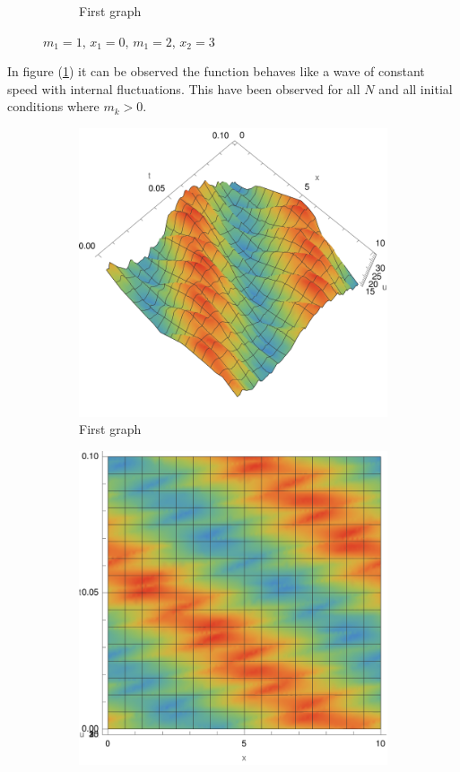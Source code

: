 \documentclass[english,master]{liumaiex}
\theoremstyle{plain}
\theoremstyle{definition}
\begin{document}
\begin{figure}[H]
\begin{subfigure}{0.44\textwidth}
        \caption{First graph}
    \end{subfigure}
    \caption{$m_1 = 1$, $x_1 = 0$, $m_1 = 2$, $x_2 = 3$}
    \label{fig:u2N}
\end{figure}
In figure (\ref{fig:u2N}) it can be observed the function behaves like a wave of constant speed with internal fluctuations. This have been observed for all $N$ and all initial conditions where $m_k > 0$.
\begin{figure}[H]
	\begin{subfigure}{0.44\textwidth}
		\includegraphics[width=\textwidth]{graphs/per4N/u3D.pdf}
        \caption{First graph}
    \end{subfigure}
	\hfill
	\begin{subfigure}{0.44\textwidth}
		\includegraphics[width=\textwidth]{graphs/per4N/u2D.pdf}

\end{subfigure}
\end{figure}
\end{document}
